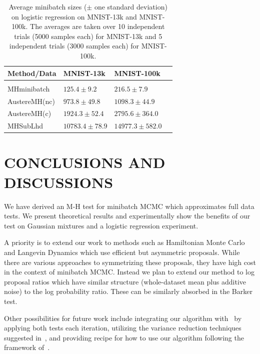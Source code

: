 \documentclass[letterpaper]{article}
\begin{document}
\begin{table}[t]
\caption{Average minibatch sizes ($\pm$ one standard deviation) on logistic
regression on MNIST-13k and MNIST-100k.  The averages are taken over 10
independent trials (5000 samples each) for MNIST-13k and 5 independent trials
(3000 samples each) for MNIST-100k.}
\small %
\label{tab:logistic}
\vskip 0.15in
\begin{center}
\begin{tabular}{l l l l}
\textbf{Method/Data} & \textbf{MNIST-13k} & \textbf{MNIST-100k}  \\
\hline \\
{\sc MHminibatch}   & $125.4\pm 9.2$    & $216.5 \pm 7.9$ \\
{\sc AustereMH(nc)} & $973.8\pm 49.8$   & $1098.3 \pm 44.9$ \\
{\sc AustereMH(c)}  & $1924.3\pm 52.4$  & $2795.6 \pm 364.0$ \\
{\sc MHSubLhd}      & $10783.4\pm 78.9$ & $14977.3 \pm 582.0$ \\
\end{tabular}
\end{center}
\vskip -0.1in
\end{table}


\section{CONCLUSIONS AND DISCUSSIONS}\label{sec:conclusion}

We have derived an M-H test for minibatch MCMC which approximates full data
tests. We present theoretical results and experimentally show the benefits of
our test on Gaussian mixtures and a logistic regression experiment.

A priority is to extend our work to methods such as Hamiltonian Monte Carlo and Langevin Dynamics
which use efficient but asymmetric proposals. While there are various approaches
to symmetrizing these proposals, they have high cost in the context of minibatch
MCMC. Instead we plan to extend our method to log proposal ratios which have
similar structure (whole-dataset mean plus additive noise) to the log probability
ratio. These can be similarly absorbed in the Barker test. 

Other possibilities for future work include integrating our algorithm
with~\citep{cutting_mh_2014} by applying both tests each iteration, utilizing
the variance reduction techniques suggested in~\citep{DBLP:conf/icml/ChenG16},
and providing recipe for how to use our algorithm following the framework
of~\citep{sgmcmc_2015}.
\end{document}
